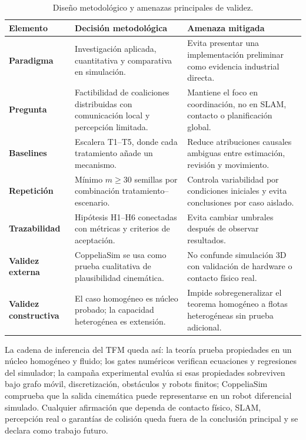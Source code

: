 \begin{table}[H]
\centering
\renewcommand{\arraystretch}{1.22}
\caption[Diseño metodológico y amenazas de validez]{Diseño metodológico y amenazas principales de validez.}
\label{tab:metodologia_validez}
\begin{tabularx}{\textwidth}{@{}>{\bfseries}p{}Y Y@{}}
\toprule
Elemento & Decisión metodológica & Amenaza mitigada \\
\midrule
Paradigma & Investigación aplicada, cuantitativa y comparativa en simulación. &
Evita presentar una implementación preliminar como evidencia industrial directa. \\
Pregunta & Factibilidad de coaliciones distribuidas con comunicación local y percepción limitada. &
Mantiene el foco en coordinación, no en SLAM, contacto o planificación global. \\
Baselines & Escalera T1--T5, donde cada tratamiento añade un mecanismo. &
Reduce atribuciones causales ambiguas entre estimación, revisión y movimiento. \\
Repetición & Mínimo $m\geq30$ semillas por combinación tratamiento--escenario. &
Controla variabilidad por condiciones iniciales y evita conclusiones por caso aislado. \\
Trazabilidad & Hipótesis H1--H6 conectadas con métricas y criterios de aceptación. &
Evita cambiar umbrales después de observar resultados. \\
Validez externa & CoppeliaSim se usa como prueba cualitativa de plausibilidad cinemática. &
No confunde simulación 3D con validación de hardware o contacto físico real. \\
Validez constructiva & El caso homogéneo es núcleo probado; la capacidad heterogénea es extensión. &
Impide sobregeneralizar el teorema homogéneo a flotas heterogéneas sin prueba adicional. \\
\bottomrule
\end{tabularx}
\end{table}

La cadena de inferencia del TFM queda así: la teoría prueba propiedades en un núcleo
homogéneo y fluido; los gates numéricos verifican ecuaciones y regresiones del
simulador; la campaña experimental evalúa si esas propiedades sobreviven bajo grafo
móvil, discretización, obstáculos y robots finitos; CoppeliaSim comprueba que la salida
cinemática puede representarse en un robot diferencial simulado. Cualquier afirmación
que dependa de contacto físico, SLAM, percepción real o garantías de colisión queda fuera
de la conclusión principal y se declara como trabajo futuro.

